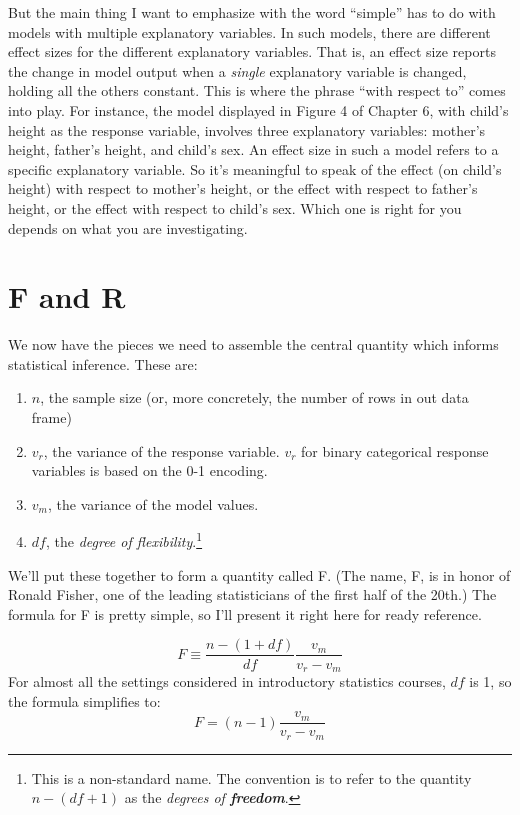 \documentclass[]{tufte-book}
\providecommand{\tightlist}{%
  \setlength{\itemsep}{0pt}\setlength{\parskip}{0pt}}
\begin{document}
But the main thing I want to emphasize with the word ``simple'' has to do with models with multiple explanatory variables. In such models, there are different effect sizes for the different explanatory variables. That is, an effect size reports the change in model output when a \emph{single} explanatory variable is changed, holding all the others constant. This is where the phrase ``with respect to'' comes into play. For instance, the model displayed in Figure 4 of Chapter 6, with child's height as the response variable, involves three explanatory variables: mother's height, father's height, and child's sex. An effect size in such a model refers to a specific explanatory variable. So it's meaningful to speak of the effect (on child's height) with respect to mother's height, or the effect with respect to father's height, or the effect with respect to child's sex. Which one is right for you depends on what you are investigating.

\hypertarget{f-and-r}{%
\chapter{F and R}\label{f-and-r}}

We now have the pieces we need to assemble the central quantity which informs statistical inference. These are:

\begin{enumerate}
\def\labelenumi{\arabic{enumi}.}
\tightlist
\item
  \(n\), the sample size (or, more concretely, the number of rows in out data frame)
\item
  \(v_r\), the variance of the response variable. \(v_r\) for binary categorical response variables is based on the 0-1 encoding.
\item
  \(v_m\), the variance of the model values.
\item
  \(df\), the \emph{degree of flexibility}.\footnote{This is a non-standard name. The convention is to refer to the quantity \(n - (df + 1)\) as the \emph{degrees of \textbf{freedom}}.}
\end{enumerate}

We'll put these together to form a quantity called F. (The name, F, is in honor of Ronald Fisher, one of the leading statisticians of the first half of the 20th.) The formula for F is pretty simple, so I'll present it right here for ready reference.

\[F \equiv \frac{n - (1 + df)}{df} \frac{v_m}{v_r - v_m}\]
For almost all the settings considered in introductory statistics courses, \(df\) is 1, so the formula simplifies to:
\[F =  (n-1) \frac{v_m}{v_r - v_m}\]
\end{document}
